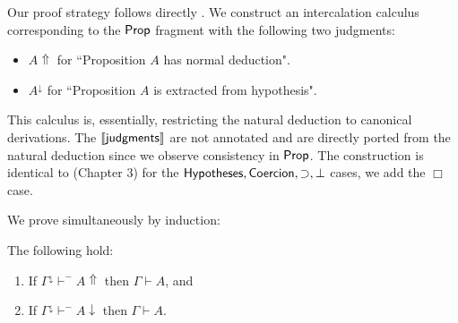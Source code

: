 Our proof strategy follows directly \cite{pfenning2004automated}. We construct an intercalation calculus \cite{sieg1998normal} corresponding to the ${\sf Prop}$ fragment  with the following two judgments:
\begin{itemize}
	\item[] $A\Uparrow$ for ``Proposition $A$ has normal deduction".
	\item[] $A^\downarrow$ for ``Proposition $A$ is extracted from hypothesis".
\end{itemize}
This calculus is, essentially, restricting the natural deduction to canonical derivations. The $\llbracket {\sf judgments} \rrbracket$ are not annotated and are directly ported from the natural deduction since we observe consistency in ${\sf Prop}$. 
The construction is identical to \cite{pfenning2004automated} (Chapter 3) for the ${\sf Hypotheses},{\sf Coercion},\supset, \bot$ cases, we add the $\Box$ case.
We prove simultaneously by induction:
\begin{theorem}
The following hold:
\begin{enumerate}
\item If $\Gamma^\downarrow\vdash^{-} A\Uparrow$ then $\Gamma\vdash A$, and
\item If $\Gamma^\downarrow\vdash^{-} A\downarrow $ then $\Gamma\vdash A$.
\end{enumerate}
\end{theorem}
